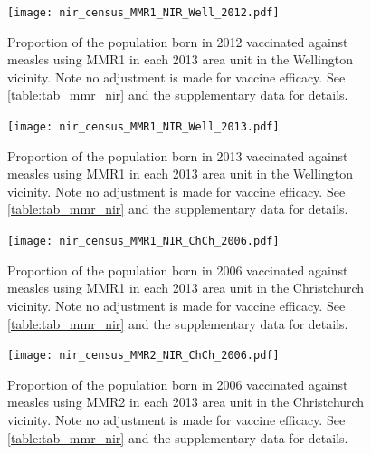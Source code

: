 \documentclass{article}
\begin{document}
\begin{figure}
\begin{center}
    \texttt{[image: nir\_census\_MMR1\_NIR\_Well\_2012.pdf]}
 \end{center}
    \caption{Proportion of the population born in 2012 vaccinated against measles using MMR1 in each 2013 area unit in the Wellington vicinity. Note no adjustment is made for vaccine efficacy. See \autoref{table:tab_mmr_nir} and the supplementary data for details.}
\label{fig:fig12012_w}
\end{figure}


\begin{figure}
\begin{center}
    \texttt{[image: nir\_census\_MMR1\_NIR\_Well\_2013.pdf]}
 \end{center}
    \caption{Proportion of the population born in 2013 vaccinated against measles using MMR1 in each 2013 area unit in the Wellington vicinity. Note no adjustment is made for vaccine efficacy. See \autoref{table:tab_mmr_nir} and the supplementary data for details.}
\label{fig:fig12013_w}
\end{figure}


\begin{figure}
   \begin{center}
    \texttt{[image: nir\_census\_MMR1\_NIR\_ChCh\_2006.pdf]}
    \end{center}
    \caption{Proportion of the population born in 2006 vaccinated against measles using MMR1 in each 2013 area unit in the Christchurch vicinity. Note no adjustment is made for vaccine efficacy. See \autoref{table:tab_mmr_nir} and the supplementary data for details.}
\label{fig:fig12006_c}
\end{figure}

\begin{figure}
\begin{center}
\texttt{[image: nir\_census\_MMR2\_NIR\_ChCh\_2006.pdf]}
\end{center}
    \caption{Proportion of the population born in 2006 vaccinated against measles using MMR2 in each 2013 area unit in the Christchurch vicinity. Note no adjustment is made for vaccine efficacy. See \autoref{table:tab_mmr_nir} and the supplementary data for details.}
\label{fig:fig22006_c}
\end{figure}
\end{document}
